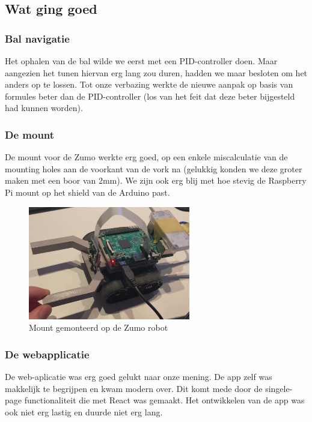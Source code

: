 \subsection{Wat ging goed}
\subsubsection*{Bal navigatie}
Het ophalen van de bal wilde we eerst met een PID-controller doen. Maar aangezien het tunen hiervan erg lang zou duren, hadden we maar besloten om het anders op te lossen. Tot onze verbazing werkte de nieuwe aanpak op basis van formules beter dan de PID-controller (los van het feit dat deze beter bijgesteld had kunnen worden).

\subsubsection*{De mount}
De mount voor de Zumo werkte erg goed, op een enkele miscalculatie van de mounting holes aan de voorkant van de vork na (gelukkig konden we deze groter maken met een boor van 2mm). We zijn ook erg blij met hoe stevig de Raspberry Pi mount op het shield van de Arduino past.

\begin{figure}[H]
    \centering
    \includegraphics[width=200pt]{img/mount.png}
    \caption{Mount gemonteerd op de Zumo robot}
    \label{fig:mounted_mount}
\end{figure}

\subsubsection*{De webapplicatie}

De web-aplicatie was erg goed gelukt naar onze mening. De app zelf was makkelijk te begrijpen en kwam modern over. Dit komt mede door de singele-page functionaliteit die met React was gemaakt. Het ontwikkelen van de app was ook niet erg lastig en duurde niet erg lang.\\

